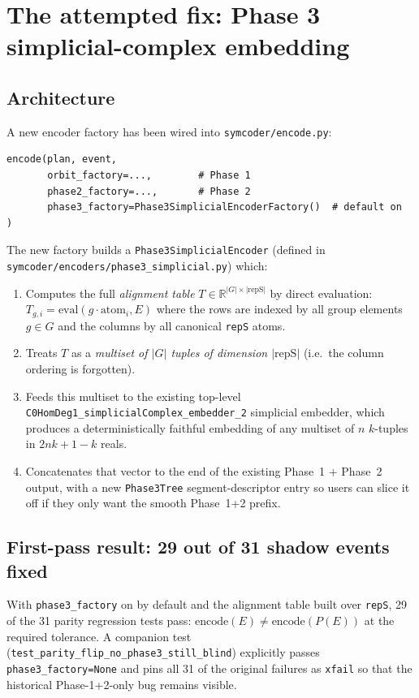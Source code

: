 \documentclass[a4paper,11pt]{article}
\begin{document}
\section{The attempted fix: Phase 3 simplicial-complex embedding}

\subsection{Architecture}
A new encoder factory has been wired into
\texttt{symcoder/encode.py}:

\begin{lstlisting}
encode(plan, event,
       orbit_factory=...,        # Phase 1
       phase2_factory=...,       # Phase 2
       phase3_factory=Phase3SimplicialEncoderFactory()  # default on
)
\end{lstlisting}

The new factory builds a \texttt{Phase3SimplicialEncoder} (defined in
\texttt{symcoder/encoders/phase3\_simplicial.py}) which:

\begin{enumerate}[nosep]
  \item Computes the full \emph{alignment table}
        $T \in \mathbb{R}^{|G| \times |\text{repS}|}$ by direct
        evaluation: $T_{g,i} = \text{eval}(g \cdot \text{atom}_i, E)$
        where the rows are indexed by all group elements
        $g \in G$ and the columns by all canonical \texttt{repS} atoms.
  \item Treats $T$ as a \emph{multiset of $|G|$ tuples of dimension
        $|\text{repS}|$} (i.e.\ the column ordering is forgotten).
  \item Feeds this multiset to the existing top-level
        \texttt{C0HomDeg1\_simplicialComplex\_embedder\_2} simplicial
        embedder, which produces a deterministically faithful
        embedding of any multiset of $n$ $k$-tuples in
        $2nk + 1 - k$ reals.
  \item Concatenates that vector to the end of the existing
        Phase~1 + Phase~2 output, with a new \texttt{Phase3Tree}
        segment-descriptor entry so users can slice it off if they
        only want the smooth Phase~1+2 prefix.
\end{enumerate}

\subsection{First-pass result: 29 out of 31 shadow events fixed}
With \texttt{phase3\_factory} on by default and the alignment table
built over \texttt{repS}, 29 of the 31 parity regression tests pass:
$\text{encode}(E) \neq \text{encode}(P(E))$ at the required tolerance.
A companion test
(\texttt{test\_parity\_flip\_no\_phase3\_still\_blind}) explicitly
passes \texttt{phase3\_factory=None} and pins all 31 of the original
failures as \texttt{xfail} so that the historical Phase-1+2-only bug
remains visible.
\end{document}
